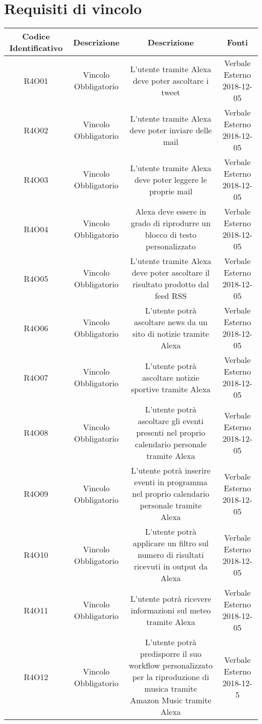 \section{Requisiti di vincolo}
\begin{tabularx}{\textwidth}{|C|C|C|C|}
	\hline
	\textbf{Codice Identificativo}& \textbf{Descrizione} & \textbf{Descrizione} & \textbf{Fonti}\\
	\hline	
	\endhead
	R4O01&Vincolo Obbligatorio  &L'utente tramite Alexa deve poter ascoltare i tweet & Verbale Esterno 2018-12-05 \\
	\hline
	R4O02&Vincolo Obbligatorio  &L'utente tramite Alexa deve poter inviare delle mail & Verbale Esterno 2018-12-05 \\
	\hline
	R4O03&Vincolo Obbligatorio  &L'utente tramite Alexa deve poter leggere le proprie mail & Verbale Esterno 2018-12-05 \\
	\hline
	R4O04&Vincolo Obbligatorio  &Alexa deve essere in grado di riprodurre un blocco di testo personalizzato & Verbale Esterno 2018-12-05 \\
	\hline
	R4O05&Vincolo Obbligatorio  &L'utente tramite Alexa deve poter ascoltare il risultato prodotto dal feed RSS & Verbale Esterno 2018-12-05 \\
	\hline
	R4O06 &Vincolo Obbligatorio& L'utente potrà ascoltare news da un sito di notizie tramite Alexa &Verbale Esterno 2018-12-05\\
	\hline
	R4O07 &Vincolo Obbligatorio& L'utente potrà ascoltare notizie sportive tramite Alexa  &Verbale Esterno 2018-12-05\\
	\hline
	R4O08 &Vincolo Obbligatorio&L'utente potrà ascoltare gli eventi presenti nel proprio calendario personale tramite Alexa  &Verbale Esterno 2018-12-05\\
	\hline
	R4O09 &Vincolo Obbligatorio& L'utente potrà inserire eventi in programma nel proprio calendario personale  tramite Alexa& Verbale Esterno 2018-12-05\\
	\hline
	R4O10 &Vincolo Obbligatorio &L'utente potrà applicare un filtro sul numero di risultati ricevuti in output da Alexa &Verbale Esterno 2018-12-05\\
	\hline
	R4O11 &Vincolo Obbligatorio &L'utente potrà ricevere informazioni sul meteo tramite Alexa& Verbale Esterno 2018-12-05\\
	\hline
	R4O12&Vincolo Obbligatorio&L'utente potrà predisporre il suo workflow personalizzato per la riproduzione di musica tramite Amazon Music tramite Alexa& Verbale Esterno 2018-12-5 \\

\end{tabularx}
